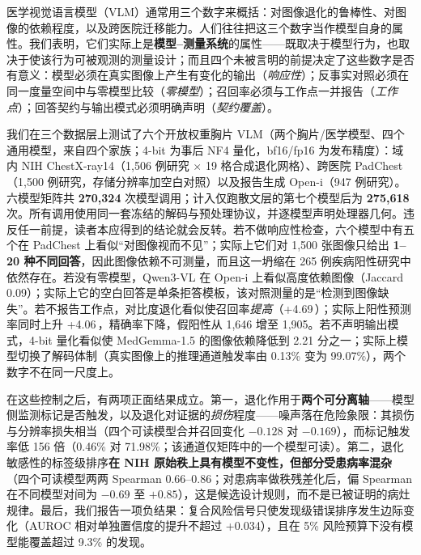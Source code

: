 医学视觉语言模型（VLM）通常用三个数字来概括：对图像退化的鲁棒性、对图像的依赖程度，以及跨医院迁移能力。人们往往把这三个数字当作模型自身的属性。我们表明，它们实际上是\textbf{模型--测量系统}的属性——既取决于模型行为，也取决于使该行为可被观测的测量设计；而且四个未被言明的前提决定了这些数字是否有意义：模型必须在真实图像上产生有变化的输出（\emph{响应性}）；反事实对照必须在同一度量空间中与零模型比较（\emph{零模型}）；召回率必须与工作点一并报告（\emph{工作点}）；回答契约与输出模式必须明确声明（\emph{契约覆盖}）。

我们在三个数据层上测试了六个开放权重胸片 VLM（两个胸片/医学模型、四个通用模型，来自四个家族；4-bit 为事后 NF4 量化，bf16/fp16 为发布精度）：域内 NIH ChestX-ray14（1,506 例研究 $\times$ 19 格合成退化网格）、跨医院 PadChest（1,500 例研究，存储分辨率加空白对照）以及报告生成 Open-i（947 例研究）。六模型矩阵共 \textbf{270,324} 次模型调用；计入仅跑散文层的第七个模型后为 \textbf{275,618} 次。所有调用使用同一套冻结的解码与预处理协议，并逐模型声明处理器几何。违反任一前提，读者本应得到的结论就会反转。若不做响应性检查，六个模型中有五个在 PadChest 上看似``对图像视而不见''；实际上它们对 1,500 张图像只给出 \textbf{1--20 种不同回答}，因此图像依赖不可测量，而且这一坍缩在 265 例疾病阳性研究中依然存在。若没有零模型，Qwen3-VL 在 Open-i 上看似高度依赖图像（Jaccard 0.09）；实际上它的空白回答是单条拒答模板，该对照测量的是``检测到图像缺失''。若不报告工作点，对比度退化看似使召回率\emph{提高}（+4.69\,\pp{}）；实际上阳性预测率同时上升 +4.06\,\pp{}，精确率下降，假阳性从 1,646 增至 1,905。若不声明输出模式，4-bit 量化看似使 MedGemma-1.5 的图像依赖降低到 2.21 分之一；实际上模型切换了解码体制（真实图像上的推理通道触发率由 0.13\% 变为 99.07\%），两个数字不在同一尺度上。

在这些控制之后，有两项正面结果成立。第一，退化作用于\textbf{两个可分离轴}——模型侧监测标记是否触发，以及退化对证据的\emph{损伤}程度——噪声落在危险象限：其损伤与分辨率损失相当（四个可读模型合并召回变化 $-0.128$ 对 $-0.169$），而标记触发率低 156 倍（0.46\% 对 71.98\%；该通道仅矩阵中的一个模型可读）。第二，退化敏感性的标签级排序\textbf{在 NIH 原始秩上具有模型不变性，但部分受患病率混杂}（四个可读模型两两 Spearman 0.66--0.86；对患病率做秩残差化后，偏 Spearman 在不同模型对间为 $-0.69$ 至 $+0.85$），这是候选设计规则，而不是已被证明的病灶规律。最后，我们报告一项负结果：复合风险信号只使发现级错误排序发生边际变化（AUROC 相对单独置信度的提升不超过 +0.034），且在 5\% 风险预算下没有模型能覆盖超过 9.3\% 的发现。

